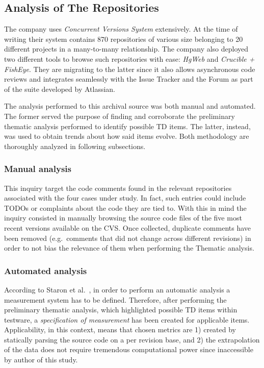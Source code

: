 \subsection{Analysis of The Repositories} \label{sec:analysis_of_the_repos}
The company uses \textit{Concurrent Versions System} extensively. At the time of writing their system contains 870 repositories of various size belonging to 20 different projects in a many-to-many relationship. The company also deployed two different tools to browse such repositories with ease: \textit{HgWeb} and \textit{Crucible + FishEye}. They are migrating to the latter since it also allows asynchronous code reviews and integrates seamlessly with the Issue Tracker and the Forum as part of the suite developed by Atlassian.

The analysis performed to this archival source was both manual and automated. The former served the purpose of finding and corroborate the preliminary thematic analysis performed to identify possible TD items. The latter, instead, was used to obtain trends about how said items evolve. Both methodology are thoroughly analyzed in following subsections.

\subsubsection{Manual analysis}
    This inquiry target the code comments found in the relevant repositories associated with the four cases under study. In fact, such entries could include TODOs or complaints about the code they are tied to. With this in mind the inquiry consisted in manually browsing the source code files of the five most recent versions available on the CVS. Once collected, duplicate comments have been removed (e.g.\ comments that did not change across different revisions) in order to not bias the relevance of them when performing the Thematic analysis.


\subsubsection{Automated analysis} \label{sec:automated_analysis}
    According to Staron et al.\ \cite{metrics_paper}, in order to perform an automatic analysis a measurement system has to be defined. Therefore, after performing the preliminary thematic analysis, which highlighted possible TD items within testware, a \textit{specification of measurement} has been created for applicable items. Applicability, in this context, means that chosen metrics are 1) created by statically parsing the source code on a per revision base, and 2) the extrapolation of the data does not require tremendous computational power since inaccessible by author of this study.
    
